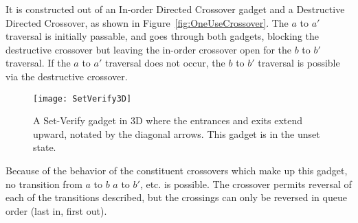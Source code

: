 It is constructed out of an In-order Directed Crossover gadget and a Destructive Directed Crossover, as shown in Figure~\ref{fig:OneUseCrossover}. The $a$ to $a'$ traversal is initially passable, and goes through both gadgets,
blocking the destructive crossover but leaving the in-order crossover open for the $b$ to $b'$ traversal. If the $a$ to $a'$ traversal does not occur, the $b$ to $b'$ traversal is possible via the destructive crossover.


\begin{wrapfigure}{hr}{0.45\textwidth}
\vspace{-5mm}
  \centering
    \texttt{[image: SetVerify3D]}
    \caption{A Set-Verify gadget in 3D where the entrances and exits extend upward, notated by the diagonal arrows. This gadget is in the unset state.}
    \label{fig:3DSetVerify}
    \vspace{-12mm}
\end{wrapfigure}


Because of the behavior of the constituent crossovers which make up this gadget, no transition from $a$ to $b$ $a$ to $b'$, etc. is possible. The crossover permits reversal of each of the transitions described, but the crossings can only be reversed in queue order (last in, first out).
%


